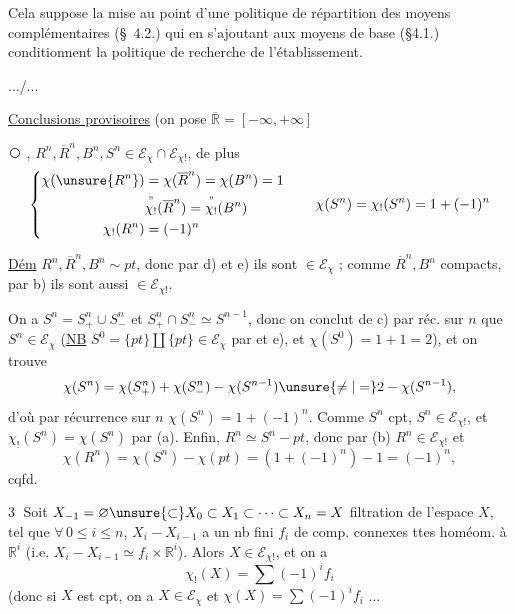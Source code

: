 Cela suppose la mise au point d'une politique de répartition des moyens complémentaires (\S\ 4.2.) qui en s'ajoutant aux moyens de base (\S4.1.) conditionnent la politique de recherche de l'établissement.

.../...


\uline{Conclusions provisoires} (on pose $\overline{\mathbb{R}}=[-\infty,+\infty]$


\textcircled{} , $R^n,\overline{R}^n,B^n,S^n\in\mathcal{E}_{\chi}\cap\mathcal{E}_{\chi!}$, de plus
\[
\left\{\begin{aligned}
\chi(\unsure{R^n})&=\chi(\overline{R}^n)=\chi(B^n)=1\\
&\overset{\text{''}}{\chi_!}(\overline{R}^n)=\overset{\text{''}}{\chi_!}(B^n)\\
\chi_!(R^n)&=(-1)^n
\end{aligned}\right.
\qquad
\chi(S^n)=\chi_!(S^n)=1+(-1)^n
\]

\uline{Dém} $R^n,\overline{R}^n,B^n\sim pt$, donc par d) et e) ils sont $\in\mathcal{E}_{\chi}$ ; comme $\overline{R}^n,B^n$ compacts, par b) ils sont aussi $\in\mathcal{E}_{\chi!}$.

On a $S^n=S^n_+\cup S^n_-$ et $S^n_+\cap S^n_-\simeq S^{n-1}$,  donc on conclut de c) par réc. sur $n$ que $S^n\in\mathcal{E}_{\chi}$ (\uline{NB} $S^0=\{pt\}\amalg\{pt\}\in\mathcal{E}_{\chi}$ par  et e), et $\chi(S^0)=1+1=2$), et on trouve
\[
\chi(S^n)=\chi(S^n_+)+\chi(S^n_-)-\chi(S^{n-1})\unsure{\ne|=}2-\chi(S^{n-1}),
\]
d'où par récurrence sur $n$ $\chi(S^n)=1+(-1)^n$. Comme $S^n$ cpt, $S^n\in\mathcal{E}_{\chi!}$, et $\chi_!(S^n)=\chi(S^n)$ par (a). Enfin, $R^n\simeq S^n-pt$, donc par (b) $R^n\in\mathcal{E}_{\chi!}$ et
\[
\chi(R^n)=\chi(S^n)-\chi(pt)=(1+(-1)^n)-1=(-1)^n,
\]
cqfd.

\textcircled{3} Soit $X_{-1}=\varnothing\unsure{\subset}X_0\subset X_1\subset\cdots\subset X_n=X$ filtration de l'espace $X$, tel que $\forall\,0\leq i\leq n$, $X_i-X_{i-1}$  a un nb fini $f_i$ de comp. connexes ttes homéom. à $\mathbb{R}^i$ (i.e. $X_i-X_{i-1}\simeq f_i\times\mathbb{R}^i$). Alors $X\in\mathcal{E}_{\chi!}$, et on a
\[
\chi_!(X)=\sum(-1)^i f_i
\]
(donc si $X$ est cpt, on a $X\in\mathcal{E}_{\chi}$ et $\chi(X)=\sum(-1)^i f_i$ ...

